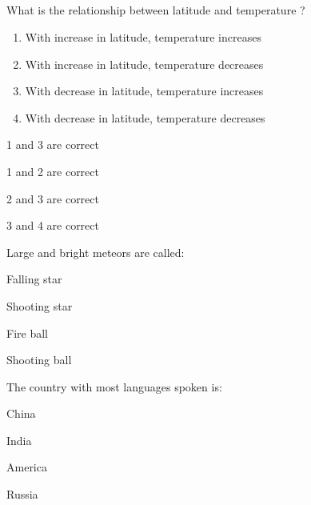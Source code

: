 
\subsection*{}

\begin{questions}



\question What is the relationship between latitude and temperature ?
  \begin{enumerate}
  \item With increase in latitude, temperature increases
  \item With increase in latitude, temperature decreases
  \item With decrease in latitude, temperature increases
  \item With decrease in latitude, temperature decreases
  \end{enumerate}

  \begin{items}
  \item 1 and 3 are correct
  \item 1 and 2 are correct
  \item* 2 and 3 are correct
  \item 3 and 4 are correct
  \end{items}

\question Large and bright meteors are called:
  \begin{items}
  \item Falling star
  \item Shooting star
  \item* Fire ball
  \item Shooting ball
  \end{items}

\question The country with most languages spoken is:

  \begin{items}
  \item China
  \item* India
  \item America
  \item Russia
  \end{items}


\end{questions}
